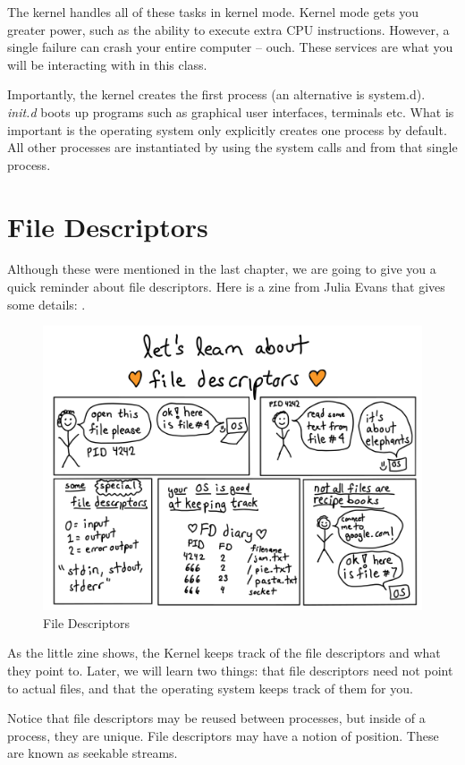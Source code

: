 The kernel handles all of these tasks in kernel mode.
Kernel mode gets you greater power, such as the ability to execute extra CPU instructions. However, a single failure can crash your entire computer -- ouch.
These services are what you will be interacting with in this class.

Importantly, the kernel creates the first process  (an alternative is system.d). \emph{init.d} boots up programs such as graphical user interfaces, terminals etc.
What is important is the operating system only explicitly creates one process by default. All other processes are instantiated by using the system calls  and  from that single process.

\section{File Descriptors}

Although these were mentioned in the last chapter, we are going to give you a quick reminder about file descriptors.
Here is a zine from Julia Evans that gives some details: \cite{evans_2018}.

\begin{figure}[htbp]
  \centering
  \includegraphics[width=.8\textwidth]{processes/images/file-descriptors.png}
  \caption{File Descriptors}
\end{figure}

As the little zine shows, the Kernel keeps track of the file descriptors and what they point to.
Later, we will learn two things: that file descriptors need not point to actual files, and that the operating system keeps track of them for you.

Notice that file descriptors may be reused between processes, but inside of a process, they are unique.
File descriptors may have a notion of position. These are known as seekable streams.

